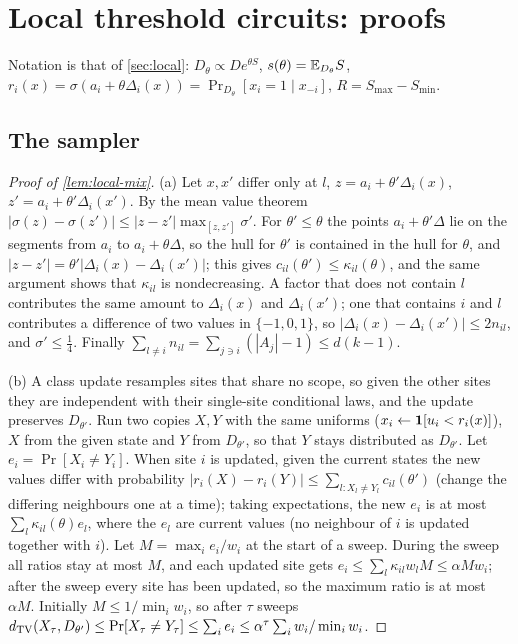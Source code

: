 \section{Local threshold circuits: proofs}\label{app:local}

Notation is that of \cref{sec:local}: $D_\theta\propto De^{\theta S}$, $s(\theta)=\mathbb{E}_{D_\theta}S$,
$r_i(x)=\sigma(a_i+\theta\Delta_i(x))=\Pr_{D_\theta}[x_i=1\mid x_{-i}]$, $R=S_{\max}-S_{\min}$.

\subsection{The sampler}

\begin{proof}[Proof of \cref{lem:local-mix}]
(a) Let $x,x'$ differ only at $l$, $z=a_i+\theta'\Delta_i(x)$, $z'=a_i+\theta'\Delta_i(x')$. By the
mean value theorem $|\sigma(z)-\sigma(z')|\le|z-z'|\max_{[z,z']}\sigma'$. For $\theta'\le\theta$ the
points $a_i+\theta'\Delta$ lie on the segments from $a_i$ to $a_i+\theta\Delta$, so the hull for
$\theta'$ is contained in the hull for $\theta$, and $|z-z'|=\theta'|\Delta_i(x)-\Delta_i(x')|$; this
gives $c_{il}(\theta')\le\kappa_{il}(\theta)$, and the same argument shows that $\kappa_{il}$ is
nondecreasing. A factor that does not contain $l$ contributes the same amount to
$\Delta_i(x)$ and $\Delta_i(x')$; one that contains $i$ and $l$ contributes a difference of two
values in $\{-1,0,1\}$, so $|\Delta_i(x)-\Delta_i(x')|\le2n_{il}$, and $\sigma'\le\frac14$. Finally
$\sum_{l\ne i}n_{il}=\sum_{j\ni i}(|A_j|-1)\le d(k-1)$.

(b) A class update resamples sites that share no scope, so given the other sites they are
independent with their single-site conditional laws, and the update preserves
$D_{\theta'}$. Run two copies $X,Y$ with the same uniforms ($x_i\gets\mathbf{1}[u_i<r_i(x)]$), $X$
from the given state and $Y$ from $D_{\theta'}$, so that $Y$ stays distributed as
$D_{\theta'}$. Let $e_i=\Pr[X_i\ne Y_i]$. When site $i$ is updated, given the current states the
new values differ with probability $|r_i(X)-r_i(Y)|\le\sum_{l:X_l\ne Y_l}c_{il}(\theta')$ (change
the differing neighbours one at a time); taking expectations, the new $e_i$ is at most
$\sum_l\kappa_{il}(\theta)e_l$, where the $e_l$ are current values (no neighbour of $i$ is
updated together with $i$). Let $M=\max_ie_i/w_i$ at the start of a sweep. During the sweep
all ratios stay at most $M$, and each updated site gets $e_i\le\sum_l\kappa_{il}w_lM\le\alpha
Mw_i$; after the sweep every site has been updated, so the maximum ratio is at most
$\alpha M$. Initially $M\le1/\min_iw_i$, so after $\tau$ sweeps
$d_{\rm TV}(X_\tau,D_{\theta'})\le\Pr[X_\tau\ne Y_\tau]\le\sum_ie_i\le\alpha^\tau\sum_iw_i/\min_iw_i$.


\end{proof}
